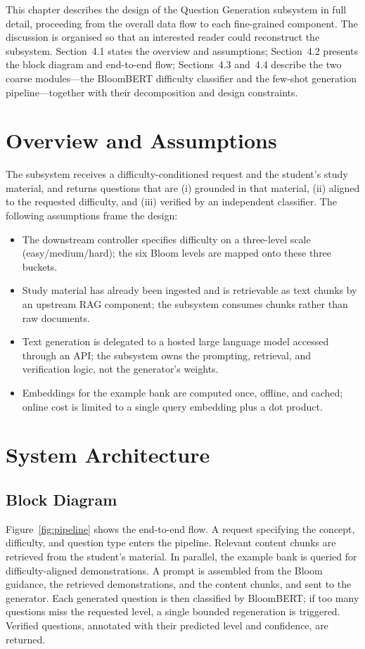 \documentclass[12pt,a4paper]{report}
\begin{document}
This chapter describes the design of the Question Generation subsystem in full
detail, proceeding from the overall data flow to each fine-grained component. The
discussion is organised so that an interested reader could reconstruct the
subsystem. Section~4.1 states the overview and assumptions; Section~4.2 presents
the block diagram and end-to-end flow; Sections~4.3 and~4.4 describe the two
coarse modules---the BloomBERT difficulty classifier and the few-shot generation
pipeline---together with their decomposition and design constraints.

\section{Overview and Assumptions}
The subsystem receives a difficulty-conditioned request and the student's study
material, and returns questions that are (i) grounded in that material,
(ii) aligned to the requested difficulty, and (iii) verified by an independent
classifier. The following assumptions frame the design:
\begin{itemize}[leftmargin=*]
  \item The downstream controller specifies difficulty on a three-level scale
  (easy/medium/hard); the six Bloom levels are mapped onto these three buckets.
  \item Study material has already been ingested and is retrievable as text
  chunks by an upstream RAG component; the subsystem consumes chunks rather than
  raw documents.
  \item Text generation is delegated to a hosted large language model accessed
  through an API; the subsystem owns the prompting, retrieval, and verification
  logic, not the generator's weights.
  \item Embeddings for the example bank are computed once, offline, and cached;
  online cost is limited to a single query embedding plus a dot product.
\end{itemize}

\section{System Architecture}

\subsection{Block Diagram}
Figure~\ref{fig:pipeline} shows the end-to-end flow. A request specifying the
concept, difficulty, and question type enters the pipeline. Relevant content
chunks are retrieved from the student's material. In parallel, the example bank
is queried for difficulty-aligned demonstrations. A prompt is assembled from the
Bloom guidance, the retrieved demonstrations, and the content chunks, and sent to
the generator. Each generated question is then classified by BloomBERT; if too
many questions miss the requested level, a single bounded regeneration is
triggered. Verified questions, annotated with their predicted level and
confidence, are returned.
\end{document}
